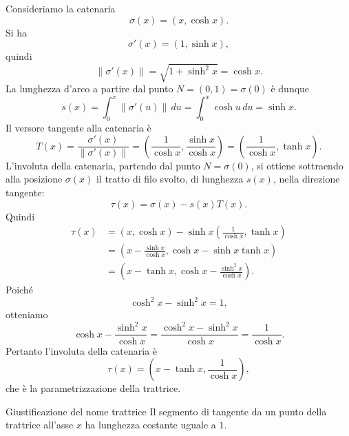 \documentclass[a4paper]{article}
\begin{document}
\begin{snippetsolution}{}
    Consideriamo la catenaria
    \[
        \sigma(x)=(x,\cosh x).
    \]
    Si ha
    \[
        \sigma'(x)=(1,\sinh x),
    \]
    quindi
    \[
        \left\|\sigma'(x)\right\|
        =
        \sqrt{1+\sinh^2x}
        =
        \cosh x.
    \]
    La lunghezza d'arco a partire dal punto \(N=(0,1)=\sigma(0)\) è dunque
    \[
        s(x)=\int_0^x \left\|\sigma'(u)\right\|\,du
        =
        \int_0^x \cosh u\,du
        =
        \sinh x.
    \]
    Il versore tangente alla catenaria è
    \[
        T(x)=\frac{\sigma'(x)}{\left\|\sigma'(x)\right\|}
        =
        \left(
            \frac{1}{\cosh x},
            \frac{\sinh x}{\cosh x}
        \right)
        =
        \left(
            \frac{1}{\cosh x},
            \tanh x
        \right).
    \]
    L'involuta della catenaria, partendo dal punto \(N=\sigma(0)\), si ottiene sottraendo alla posizione \(\sigma(x)\) il tratto di filo svolto, di lunghezza \(s(x)\), nella direzione tangente:
    \[
        \tau(x)=\sigma(x)-s(x)T(x).
    \]
    Quindi
    \begin{align*}
        \tau(x)
        &=
        (x,\cosh x)
        -
        \sinh x
        \left(
            \frac{1}{\cosh x},
            \tanh x
        \right)\\
        &=
        \left(
            x-\frac{\sinh x}{\cosh x},
            \cosh x-\sinh x\tanh x
        \right)\\
        &=
        \left(
            x-\tanh x,
            \cosh x-\frac{\sinh^2x}{\cosh x}
        \right).
    \end{align*}
    Poiché
    \[
        \cosh^2x-\sinh^2x=1,
    \]
    otteniamo
    \[
        \cosh x-\frac{\sinh^2x}{\cosh x}
        =
        \frac{\cosh^2x-\sinh^2x}{\cosh x}
        =
        \frac{1}{\cosh x}.
    \]
    Pertanto l'involuta della catenaria è
    \[
        \tau(x)=
        \left(
            x-\tanh x,
            \frac{1}{\cosh x}
        \right),
    \]
    che è la parametrizzazione della trattrice.
\end{snippetsolution}

\begin{snippetproposition}{Giustificazione del nome trattrice}
    Il segmento di tangente da un punto della trattrice all'asse \(x\) ha lunghezza costante uguale a \(1\).
\end{snippetproposition}
\end{document}
